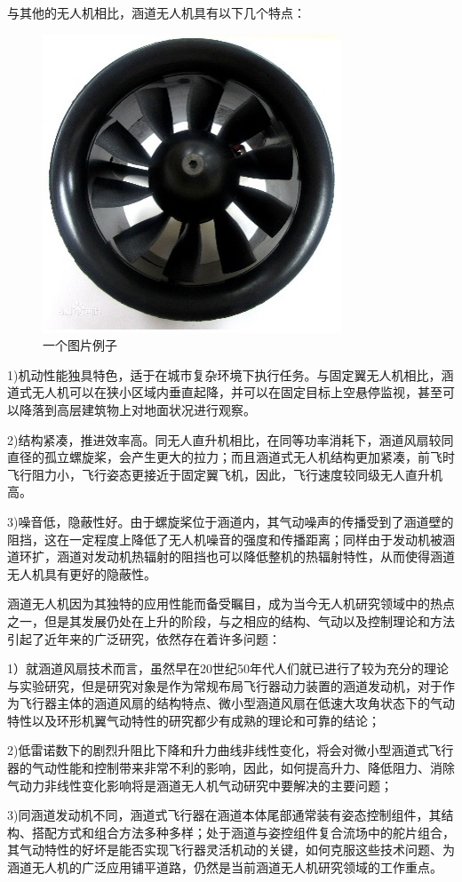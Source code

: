 \begin{ubox}
与其他的无人机相比，涵道无人机具有以下几个特点：
\begin{figure}[H]
	\centering
	\includegraphics[width=0.4\linewidth]{p1.jpg}
	\caption{一个图片例子}
	\label{fig:main}
\end{figure}

1)机动性能独具特色，适于在城市复杂环境下执行任务。与固定翼无人机相比，涵道式无人机可以在狭小区域内垂直起降，并可以在固定目标上空悬停监视，甚至可以降落到高层建筑物上对地面状况进行观察。

2)结构紧凑，推进效率高。同无人直升机相比，在同等功率消耗下，涵道风扇较同直径的孤立螺旋桨，会产生更大的拉力；而且涵道式无人机结构更加紧凑，前飞时飞行阻力小，飞行姿态更接近于固定翼飞机，因此，飞行速度较同级无人直升机高。

3)噪音低，隐蔽性好。由于螺旋桨位于涵道内，其气动噪声的传播受到了涵道壁的阻挡，这在一定程度上降低了无人机噪音的强度和传播距离；同样由于发动机被涵道环扩，涵道对发动机热辐射的阻挡也可以降低整机的热辐射特性，从而使得涵道无人机具有更好的隐蔽性。

涵道无人机因为其独特的应用性能而备受瞩目，成为当今无人机研究领域中的热点之一，但是其发展仍处在上升的阶段，与之相应的结构、气动以及控制理论和方法引起了近年来的广泛研究，依然存在着许多问题： 

1）就涵道风扇技术而言，虽然早在20世纪50年代人们就已进行了较为充分的理论与实验研究，但是研究对象是作为常规布局飞行器动力装置的涵道发动机，对于作为飞行器主体的涵道风扇的结构特点、微小型涵道风扇在低速大攻角状态下的气动特性以及环形机翼气动特性的研究都少有成熟的理论和可靠的结论；

2)低雷诺数下的剧烈升阻比下降和升力曲线非线性变化，将会对微小型涵道式飞行器的气动性能和控制带来非常不利的影响，因此，如何提高升力、降低阻力、消除气动力非线性变化影响将是涵道无人机气动研究中要解决的主要问题；

3)同涵道发动机不同，涵道式飞行器在涵道本体尾部通常装有姿态控制组件，其结构、搭配方式和组合方法多种多样；处于涵道与姿控组件复合流场中的舵片组合，其气动特性的好坏是能否实现飞行器灵活机动的关键，如何克服这些技术问题、为涵道无人机的广泛应用铺平道路，仍然是当前涵道无人机研究领域的工作重点。


\end{ubox}
